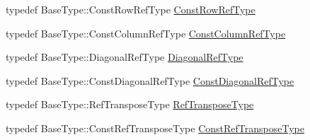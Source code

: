 \begin{DoxyCompactItemize}
typedef Base\+Type\+::\+Const\+Row\+Ref\+Type \hyperlink{classvct_frame4x4_const_base_af18cadccba2812e0d3cad82f43583ab0}{Const\+Row\+Ref\+Type}
\item 
typedef Base\+Type\+::\+Const\+Column\+Ref\+Type \hyperlink{classvct_frame4x4_const_base_a12760de72da52fc0917ad17373d369f3}{Const\+Column\+Ref\+Type}
\item 
typedef Base\+Type\+::\+Diagonal\+Ref\+Type \hyperlink{classvct_frame4x4_const_base_a6712c128a1d2b45ab9c713befeddf2c6}{Diagonal\+Ref\+Type}
\item 
typedef Base\+Type\+::\+Const\+Diagonal\+Ref\+Type \hyperlink{classvct_frame4x4_const_base_a83c846e0b484264c6d71c101b67d164a}{Const\+Diagonal\+Ref\+Type}
\item 
typedef Base\+Type\+::\+Ref\+Transpose\+Type \hyperlink{classvct_frame4x4_const_base_a1cedffcdbf60e8ec01a0a61d6ceb24b7}{Ref\+Transpose\+Type}
\item 
typedef Base\+Type\+::\+Const\+Ref\+Transpose\+Type \hyperlink{classvct_frame4x4_const_base_acac151b2d8a361ed229d8cdacac2b01f}{Const\+Ref\+Transpose\+Type}
\item 

\end{DoxyCompactItemize}
